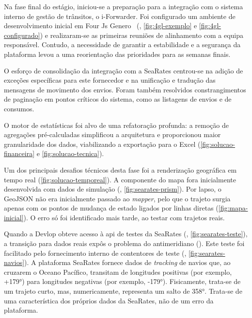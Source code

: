 Na fase final do estágio, iniciou-se a preparação para a integração com o sistema interno de gestão de trânsitos, o i-Forwarder. Foi configurado um ambiente de desenvolvimento inicial em Four Js Genero~\cite{fourjs} (, \autoref{fig:4gl-exemplo} e \autoref{fig:4gl-configurado}) e realizaram-se as primeiras reuniões de alinhamento com a equipa responsável. Contudo, a necessidade de garantir a estabilidade e a segurança da plataforma levou a uma reorientação das prioridades para as semanas finais.

O esforço de consolidação da integração com a SeaRates centrou-se na adição de exceções específicas para este fornecedor e na unificação e tradução das mensagens de movimento dos envios. Foram também resolvidos constrangimentos de paginação em pontos críticos do sistema, como as listagens de envios e de consumos.

O motor de estatísticas foi alvo de uma refatoração profunda: a remoção de agregações pré-calculadas simplificou a arquitetura e proporcionou maior granularidade dos dados, viabilizando a exportação para o Excel (\autoref{fig:solucao-financeira} e \autoref{fig:solucao-tecnica}).

Um dos principais desafios técnicos desta fase foi a renderização geográfica em tempo real (\autoref{fig:solucao-temporeal}). A componente do mapa fora inicialmente desenvolvida com dados de simulação (, \autoref{fig:searates-prism}). Por lapso, o GeoJSON não era inicialmente passado ao \textit{mapper}, pelo que o trajeto surgia apenas com os pontos de mudança de estado ligados por linhas diretas (\autoref{fig:mapa-inicial}). O erro só foi identificado mais tarde, ao testar com trajetos reais.

Quando a Devlop obteve acesso à \gls{api} de testes da SeaRates (, \autoref{fig:searates-teste}), a transição para dados reais expôs o problema do antimeridiano (). Este teste foi facilitado pelo fornecimento interno de contentores de teste (, \autoref{fig:searates-navios}). A plataforma SeaRates fornece dados de \textit{tracking} de navios que, ao cruzarem o Oceano Pacífico, transitam de longitudes positivas (por exemplo, +179°) para longitudes negativas (por exemplo, -179°). Fisicamente, trata-se de um trajeto curto, mas, numericamente, representa um salto de 358°. Trata-se de uma característica dos próprios dados da SeaRates, não de um erro da plataforma.


